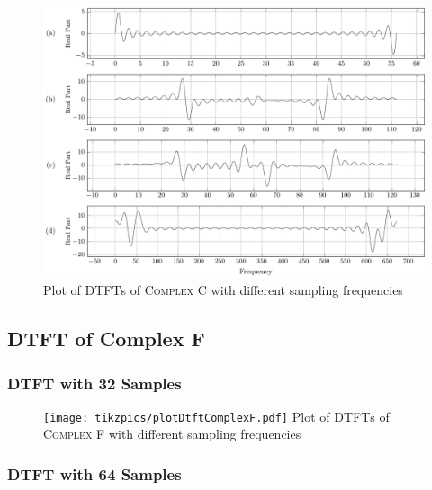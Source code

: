 \documentclass[../../course]{subfiles}
\begin{document}
\begin{figure} [H]
    \centering
     {
        \includegraphics[height = 0.8\textheight] {tikzpics/plotDtftComplexC64.pdf}
    }
     {Plot of \textsc{DTFT}s of \textsc{Complex C} with different sampling frequencies}
    \label{plt:dtftComplexC}
\end{figure}


\subsection{DTFT of Complex F} \label{ssec:dtftCplxF}

\subsubsection{DTFT with 32 Samples}

\begin{figure} [H]
    \centering
     {
        \texttt{[image: tikzpics/plotDtftComplexF.pdf]}
    }
     {Plot of \textsc{DTFT}s of \textsc{Complex F} with different sampling frequencies}
    \label{plt:dtftComplexF}
\end{figure}

\subsubsection{DTFT with 64 Samples}
\end{document}
